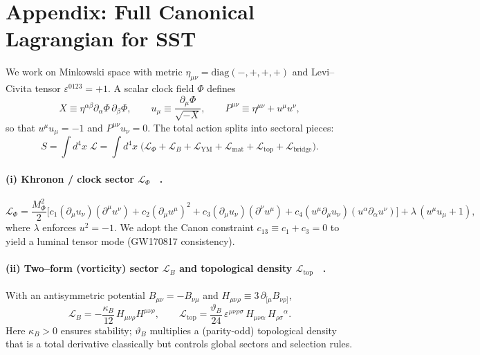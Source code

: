 \documentclass[10pt,reprint,aps,onecolumn,nofootinbib]{revtex4-2}
\begin{document}
    \appendix

\section{Appendix: Full Canonical Lagrangian for SST}
    \label{app:fullL}

    We work on Minkowski space with metric \(\eta_{\mu\nu}=\mathrm{diag}(-,+,+,+)\) and Levi–Civita tensor \(\varepsilon^{0123}=+1\).
    A scalar clock field \(\Phi\) defines
    \[
        X \equiv \eta^{\alpha\beta}\partial_\alpha\Phi\,\partial_\beta\Phi,\qquad
        u_\mu \equiv \frac{\partial_\mu\Phi}{\sqrt{-X}},\qquad
        P^{\mu\nu} \equiv \eta^{\mu\nu}+u^\mu u^\nu,
    \]
    so that \(u^\mu u_\mu=-1\) and \(P^{\mu\nu}u_\nu=0\).
    The total action splits into sectoral pieces:
    \begin{equation}
    S=\int d^4x\;\mathcal{L}
    =\int d^4x\;\Big(
    \mathcal{L}_\Phi
    +\mathcal{L}_B
    +\mathcal{L}_{\mathrm{YM}}
    +\mathcal{L}_{\mathrm{mat}}
    +\mathcal{L}_{\mathrm{top}}
    +\mathcal{L}_{\mathrm{bridge}}
    \Big).
    \label{eq:S_total_app}
    \end{equation}

    \paragraph*{(i) Khronon / clock sector \(\mathcal{L}_\Phi\)~ \cite{sstLagrangian}.}
        \begin{equation}
        \mathcal{L}_\Phi
        =\frac{M_\Phi^2}{2}\Big[
            c_1(\partial_\mu u_\nu)(\partial^\mu u^\nu)
            +c_2(\partial_\mu u^\mu)^2
            +c_3(\partial_\mu u_\nu)(\partial^\nu u^\mu)
            +c_4(u^\mu\partial_\mu u_\nu)(u^\alpha\partial_\alpha u^\nu)
            \Big]
        +\lambda\,(u^\mu u_\mu+1),
        \label{eq:Lphi_app}
        \end{equation}
        where \(\lambda\) enforces \(u^2=-1\). We adopt the Canon constraint \(c_{13}\equiv c_1+c_3=0\) to yield a luminal tensor mode (GW170817 consistency).

    \paragraph*{(ii) Two–form (vorticity) sector \(\mathcal{L}_B\) and topological density \(\mathcal{L}_{\mathrm{top}}\)~ \cite{sstLagrangian}.}
        With an antisymmetric potential \(B_{\mu\nu}=-B_{\nu\mu}\) and \(H_{\mu\nu\rho}\equiv 3\,\partial_{[\mu}B_{\nu\rho]}\),
        \begin{equation}
        \mathcal{L}_B
        =-\frac{\kappa_B}{12}\,H_{\mu\nu\rho}H^{\mu\nu\rho},
        \qquad
        \mathcal{L}_{\mathrm{top}}
        =\frac{\vartheta_B}{24}\,
        \varepsilon^{\mu\nu\rho\sigma}\,
        H_{\mu\nu\alpha}\,H_{\rho\sigma}{}^{\alpha}.
        \label{eq:LB_app}
        \end{equation}
        Here \(\kappa_B>0\) ensures stability; \(\vartheta_B\) multiplies a (parity-odd) topological density that is a total derivative classically but controls global sectors and selection rules.
\end{document}
